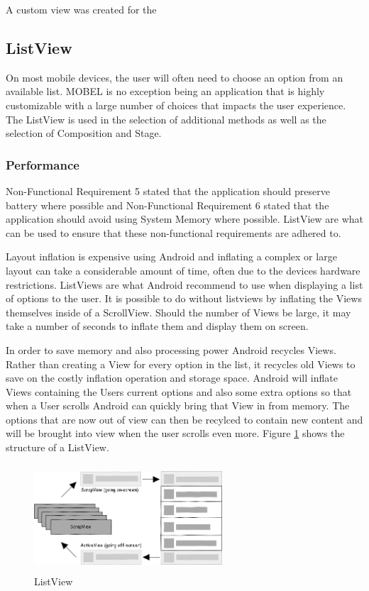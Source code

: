 \documentclass{l4proj}
\begin{document}
A custom view was created for the 


\subsection{ListView}
On most mobile devices, the user will often need to choose an option from an available list.  MOBEL is no exception being an application that is highly customizable with a large number of choices that impacts the user experience. The ListView is used in the selection of additional methods as well as the selection of Composition and Stage.

\subsubsection{Performance}
Non-Functional Requirement 5 stated that the application should preserve battery where possible and Non-Functional Requirement 6 stated that the application should avoid using System Memory where possible. ListView are what can be used to ensure that these non-functional requirements are adhered to.  

Layout inflation is expensive using Android and inflating a complex or large layout can take a considerable amount of time, often due to the devices hardware restrictions. ListViews are what Android recommend to use when displaying a list of options to the user.  It is possible to do without listviews by inflating the Views themselves inside of a ScrollView.  Should the number of Views be large, it may take a number of seconds to inflate them and display them on screen. 

In order to save memory and also processing power Android recycles Views.  Rather than creating a View for every option in the list, it recycles old Views to save on the costly inflation operation and storage space. Android will inflate Views containing the Users current options and also some extra options so that when a User scrolls Android can quickly bring that View in from memory.  The options that are now out of view can then be recylced to contain new content and will be brought into view when the user scrolls even more. Figure \ref{ListView} shows the structure of a ListView.


\begin{figure}
\centering
\includegraphics[height=4cm,width=7cm]{listview1.png}
\vspace{0mm}
\caption{ListView}
\label{ListView}
\end{figure}
\end{document}
